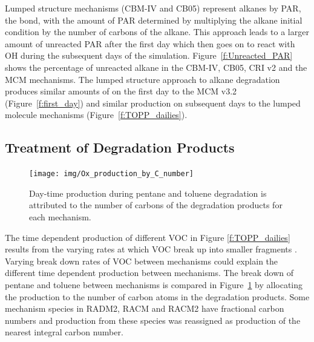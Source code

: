 Lumped structure mechanisms (CBM-IV and CB05) represent alkanes by PAR, the  bond, with the amount of PAR determined by multiplying the alkane initial condition by the number of carbons of the alkane.
This approach leads to a larger amount of unreacted PAR after the first day which then goes on to react with OH during the subsequent days of the simulation.
\mbox{Figure \ref{f:Unreacted_PAR}} shows the percentage of unreacted alkane in the CBM-IV, CB05, CRI v2 and the MCM mechanisms.
The lumped structure approach to alkane degradation produces similar amounts of  on the first day to the MCM v3.2 (\mbox{Figure \ref{f:first_day}}) and similar  production on subsequent days to the lumped molecule mechanisms (\mbox{Figure \ref{f:TOPP_dailies}}).
%
\subsection{Treatment of Degradation Products} \label{ss:products} 
%
\begin{figure}
    \centering
    \texttt{[image: img/Ox\_production\_by\_C\_number]}
    \vspace{0mm}
    \caption{Day-time  production during pentane and toluene degradation is attributed to the number of carbons of the degradation products for each mechanism.}
    \vspace{-4mm}
    \label{f:carbon}
\end{figure}
%
The time dependent  production of different VOC in Figure \ref{f:TOPP_dailies} results from the varying rates at which VOC break up into smaller fragments \citep{Butler:2011}.
Varying break down rates of VOC between mechanisms could explain the different time dependent  production between mechanisms.
The break down of pentane and toluene between mechanisms is compared in \mbox{Figure \ref{f:carbon}} by allocating the  production to the number of carbon atoms in the degradation products.
Some mechanism species in RADM2, RACM and RACM2 have fractional carbon numbers \citep{Stockwell:1990, Stockwell:1997, Goliff:2013} and  production from these species was reassigned as  production of the nearest integral carbon number.  

